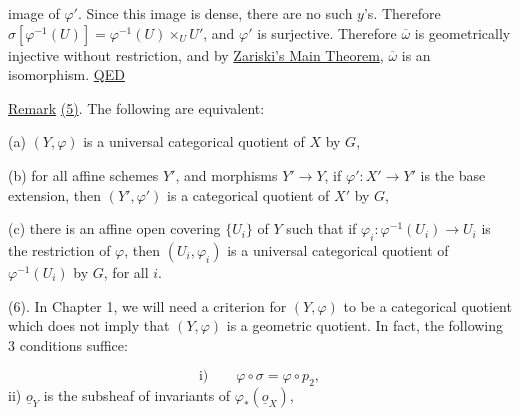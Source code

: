 
image of $\varphi'$. Since this image is dense, there are no such $y$'s.
Therefore $\sigma[\varphi^{-1}(U)]=\varphi^{-1}(U)\times_U U'$, and $\varphi'$ is surjective.
Therefore $\overline\omega$ is geometrically injective without restriction, and by \uline{Zariski's Main Theorem}, $\overline\omega$ is an isomorphism. \uline{QED}
\margin{!}

\uline{Remark} \uline{(5)}. The following are equivalent:

(a) $(Y,\varphi)$ is a universal categorical quotient of $X$ by $G$,

(b) for all affine schemes $Y'$, and morphisms $Y'\longrightarrow Y$, if $\varphi':X'\to Y'$ is the base extension, then $(Y',\varphi')$ is a categorical quotient of $X'$ by $G$,

(c) there is an affine open covering $\{U_i\}$ of $Y$ such that if $\varphi_i:\varphi^{-1}(U_i)\longrightarrow U_i$ is the restriction of $\varphi$, then $(U_i,\varphi_i)$ is a universal categorical quotient of $\varphi^{-1}(U_i)$ by $G$, for all $i$.

(6). In Chapter 1, we will need a criterion for $(Y,\varphi)$ to be a categorical quotient which does not imply that $(Y,\varphi)$ is a geometric quotient. In fact, the following 3 conditions suffice:

\[
\text{i)}\qquad\varphi\circ\sigma=\varphi\circ p_2,
\]
ii) $\underline o_Y$ is the subsheaf of invariants of $\varphi_*(\underline o_X)$,

